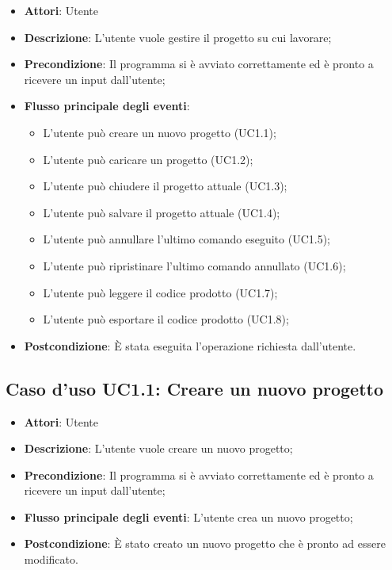 \documentclass[../AnalisiDeiRequisiti.tex]{subfiles}
\begin{document}
	\begin{itemize}
		\item \textbf{Attori}: Utente
		\item \textbf{Descrizione}: L'utente vuole gestire il progetto su cui lavorare;
		\item \textbf{Precondizione}: Il programma si è avviato correttamente ed è pronto a ricevere un input dall'utente;
		\item \textbf{Flusso principale degli eventi}: \begin{itemize}
			\item L'utente può creare un nuovo progetto (UC1.1);
			\item L'utente può caricare un progetto (UC1.2);
			\item L'utente può chiudere il progetto attuale (UC1.3);
			\item L'utente può salvare il progetto attuale (UC1.4);
			\item L'utente può annullare l'ultimo comando eseguito (UC1.5);
			\item L'utente può ripristinare l'ultimo comando annullato (UC1.6);
			\item L'utente può leggere il codice prodotto (UC1.7);
			\item L'utente può esportare il codice prodotto (UC1.8);
		\end{itemize}
		\item \textbf{Postcondizione}: È stata eseguita l'operazione richiesta dall'utente.
	\end{itemize}
	\subsection{Caso d'uso UC1.1: Creare un nuovo progetto}
	\begin{itemize}
		\item \textbf{Attori}: Utente
		\item \textbf{Descrizione}: L'utente vuole creare un nuovo progetto;
		\item \textbf{Precondizione}: Il programma si è avviato correttamente ed è pronto a ricevere un input dall'utente;
		\item \textbf{Flusso principale degli eventi}: L'utente crea un nuovo progetto;
		\item \textbf{Postcondizione}: È stato creato un nuovo progetto che è pronto ad essere modificato.
	\end{itemize}
\end{document}

